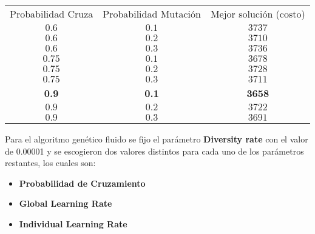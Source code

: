 \documentclass[letterpaper]{article}
\begin{document}
	\begin{center}
		\begin{tabular}[b]{| c | c | c |}
    		\hline
    		\rowcolor{black}
    		\multicolumn{3}{|c|}{\textcolor{white}{\textbf{Had20}}} \\
    		\hline
    		\hline
    		Probabilidad Cruza & Probabilidad  Mutación & Mejor solución (costo) \\
    		\hline
    		$0.6$ & $0.1$ & $3737$\\
    		\hline
    		$0.6$ & $0.2$ & $3710$\\
    		\hline
    		$0.6$ & $0.3$ & $3736$\\%
    		\hline
    		$0.75$ & $0.1$ & $3678$\\
    		\hline
    		$0.75$ & $0.2$ & $3728$\\
    		\hline
    		$0.75$ & $0.3$ & $3711$\\
    		\hline
    		\textbf{0.9} & \textbf{0.1} & \textbf{3658}\\
    		\hline
    		$0.9$ & $0.2$ & $3722$\\
    		\hline
    		$0.9$ & $0.3$ & $3691$\\
    		\hline
    	\end{tabular}
	\end{center}

	Para el algoritmo genético fluido se fijo el parámetro \textbf{Diversity rate}
	con el valor de 0.00001 y se escogieron dos valores distintos para cada uno
	de los parámetros restantes, los cuales son:
		\begin{itemize}
			\item \textbf{Probabilidad de Cruzamiento}
			
			\item \textbf{Global Learning Rate}
			
			\item \textbf{Individual Learning Rate}
		\end{itemize}
\end{document}
